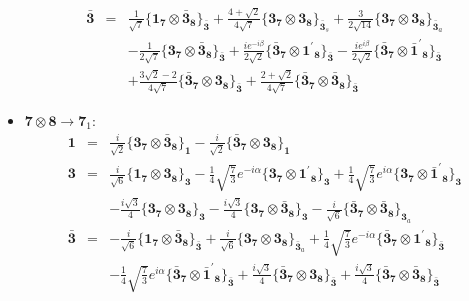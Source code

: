 \documentclass[english]{article}
\newcommand{\subcg}[3]{\big\{ {#1}\otimes{#2}\big\}^{}_{#3}}
\newcommand{\rep}[1]{\mathbf{#1}}
\begin{document}
\begin{itemize}
\begin{eqnarray*}
\rep{\bar{3}} &=& \frac{1}{\sqrt{7}}\subcg{\rep{1}_{\rep{7}}}{\rep{\bar{3}}_{\rep{8}}}{\rep{\bar{3}}}+\frac{4+\sqrt{2}}{4 \sqrt{7}}\subcg{\rep{3}_{\rep{7}}}{\rep{3}_{\rep{8}}}{\rep{\bar{3}}_{s}}+\frac{3}{2 \sqrt{14}}\subcg{\rep{3}_{\rep{7}}}{\rep{3}_{\rep{8}}}{\rep{\bar{3}}_{a}} \\ 
 & & -\frac{1}{2 \sqrt{7}}\subcg{\rep{3}_{\rep{7}}}{\rep{\bar{3}}_{\rep{8}}}{\rep{\bar{3}}}+\frac{i e^{-i \beta }}{2 \sqrt{2}}\subcg{\rep{\bar{3}}_{\rep{7}}}{\rep{1^{\prime}}_{\rep{8}}}{\rep{\bar{3}}}-\frac{i e^{i \beta }}{2 \sqrt{2}}\subcg{\rep{\bar{3}}_{\rep{7}}}{\rep{\bar{1}^{\prime}}_{\rep{8}}}{\rep{\bar{3}}} \\ 
 & & +\frac{3 \sqrt{2}-2}{4 \sqrt{7}}\subcg{\rep{\bar{3}}_{\rep{7}}}{\rep{3}_{\rep{8}}}{\rep{\bar{3}}}+\frac{2+\sqrt{2}}{4 \sqrt{7}}\subcg{\rep{\bar{3}}_{\rep{7}}}{\rep{\bar{3}}_{\rep{8}}}{\rep{\bar{3}}}
\end{eqnarray*}
\item $\rep{7}\otimes\rep{8}\to\rep{7}_{1}$:
\begin{eqnarray*}
\rep{1} &=& \frac{i}{\sqrt{2}}\subcg{\rep{3}_{\rep{7}}}{\rep{\bar{3}}_{\rep{8}}}{\rep{1}}-\frac{i}{\sqrt{2}}\subcg{\rep{\bar{3}}_{\rep{7}}}{\rep{3}_{\rep{8}}}{\rep{1}}
\\
\rep{3} &=& \frac{i}{\sqrt{6}}\subcg{\rep{1}_{\rep{7}}}{\rep{3}_{\rep{8}}}{\rep{3}}-\frac{1}{4} \sqrt{\frac{7}{3}} e^{-i \alpha }\subcg{\rep{3}_{\rep{7}}}{\rep{1^{\prime}}_{\rep{8}}}{\rep{3}}+\frac{1}{4} \sqrt{\frac{7}{3}} e^{i \alpha }\subcg{\rep{3}_{\rep{7}}}{\rep{\bar{1}^{\prime}}_{\rep{8}}}{\rep{3}} \\ 
 & & -\frac{i \sqrt{3}}{4}\subcg{\rep{3}_{\rep{7}}}{\rep{3}_{\rep{8}}}{\rep{3}}-\frac{i \sqrt{3}}{4}\subcg{\rep{3}_{\rep{7}}}{\rep{\bar{3}}_{\rep{8}}}{\rep{3}}-\frac{i}{\sqrt{6}}\subcg{\rep{\bar{3}}_{\rep{7}}}{\rep{\bar{3}}_{\rep{8}}}{\rep{3}_{a}}
\\
\rep{\bar{3}} &=& -\frac{i}{\sqrt{6}}\subcg{\rep{1}_{\rep{7}}}{\rep{\bar{3}}_{\rep{8}}}{\rep{\bar{3}}}+\frac{i}{\sqrt{6}}\subcg{\rep{3}_{\rep{7}}}{\rep{3}_{\rep{8}}}{\rep{\bar{3}}_{a}}+\frac{1}{4} \sqrt{\frac{7}{3}} e^{-i \alpha }\subcg{\rep{\bar{3}}_{\rep{7}}}{\rep{1^{\prime}}_{\rep{8}}}{\rep{\bar{3}}} \\ 
 & & -\frac{1}{4} \sqrt{\frac{7}{3}} e^{i \alpha }\subcg{\rep{\bar{3}}_{\rep{7}}}{\rep{\bar{1}^{\prime}}_{\rep{8}}}{\rep{\bar{3}}}+\frac{i \sqrt{3}}{4}\subcg{\rep{\bar{3}}_{\rep{7}}}{\rep{3}_{\rep{8}}}{\rep{\bar{3}}}+\frac{i \sqrt{3}}{4}\subcg{\rep{\bar{3}}_{\rep{7}}}{\rep{\bar{3}}_{\rep{8}}}{\rep{\bar{3}}}
\end{eqnarray*}

\end{itemize}
\end{document}

